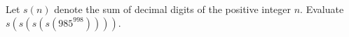 Let $s(n)$ denote the sum of decimal digits of the positive integer $n$. Evaluate $s(s(s(s(985^{998}))))$.

